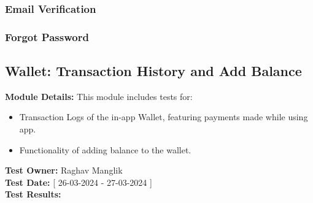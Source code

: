 \documentclass[11pt]{article}
\begin{document}
\subsubsection{Email Verification}

\subsubsection{Forgot Password}

















\subsection{Wallet: Transaction History and Add Balance}
\textbf{Module Details: }This module includes tests for:
\begin{itemize}
    \item Transaction Logs of the in-app Wallet, featuring payments made while using app.
    \item Functionality of adding balance to the wallet.
\end{itemize}
\textbf{Test Owner: }Raghav Manglik
\\
\textbf{Test Date: }[ 26-03-2024 - 27-03-2024 ]
\\
\textbf{Test Results: }
\end{document}

